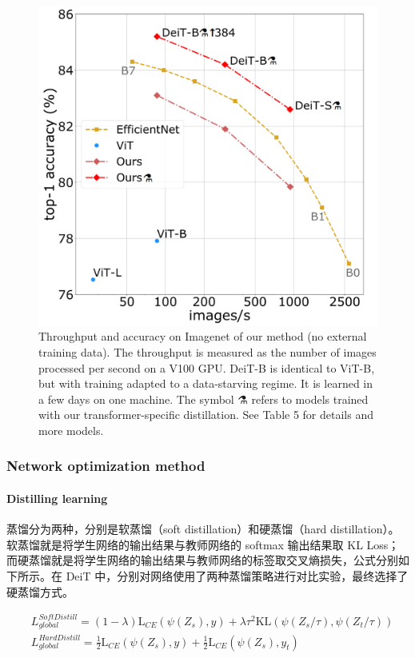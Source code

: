 \documentclass[letterpaper,10pt]{article}
\begin{document}
	\begin{figure}[htbp]
		\centering 
		\includegraphics[width=0.5
		\columnwidth]{picture/Accuracy}
		\caption{
			\label{fig: DeiT accuracy} Throughput and accuracy on Imagenet of our method (no external training data). The throughput is measured as the number of images processed per second on a V100 GPU. DeiT-B is identical to ViT-B, but with training adapted to a data-starving regime. It is learned in a few days on one machine. The symbol ⚗ refers to models trained with our transformer-specific distillation. See Table 5 for details and more models.
		}
	\end{figure}
	
	\subsubsection{Network optimization method}
	
	\paragraph{Distilling learning}
	
	蒸馏分为两种，分别是软蒸馏（soft distillation）和硬蒸馏（hard distillation）。软蒸馏就是将学生网络的输出结果与教师网络的 softmax 输出结果取 KL Loss；而硬蒸馏就是将学生网络的输出结果与教师网络的标签取交叉熵损失，公式分别如下所示。在 DeiT 中，分别对网络使用了两种蒸馏策略进行对比实验，最终选择了硬蒸馏方式。
	
	\begin{equation}
		\begin{aligned}
			& L_{global}^{SoftDistill} = \left(1-\lambda\right) \text{L}_{CE}\left(\psi(Z_s), y\right) + \lambda \tau^2 \text{KL}\left(\psi(Z_s/\tau), \psi(Z_t/\tau)\right) \\
			& L_{global}^{HardDistill} = \frac{1}{2} \text{L}_{CE}\left(\psi(Z_s), y\right) + \frac{1}{2} \text{L}_{CE}\left(\psi(Z_s),y_t\right)
		\end{aligned}
		\label{eq: distillation}
	\end{equation}
	
\end{document}
